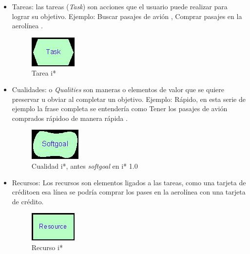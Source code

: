 \begin{itemize}
        \item Tareas: las tareas (\textit{Task}) son acciones que el usuario puede realizar para lograr su objetivo. Ejemplo: \guillemotleft Buscar pasajes de avión \guillemotright, \guillemotleft Comprar pasajes en la aerolínea \guillemotright.
                \begin{figure}[H]
            \centering
            \includegraphics{media/imagenes/i_star/sintaxis/task.jpg}
            \caption{Tarea \gls{i*}}
        \end{figure}
        \item Cualidades: o \textit{Qualities} son maneras o elementos de valor que se quiere preservar u obviar al completar un objetivo. Ejemplo: \guillemotleft Rápido\guillemotright, en esta serie de ejemplo la frase completa se entendería como \guillemotleft Tener los pasajes de avión comprados rápido\guillemotright o de manera \guillemotleft rápida \guillemotright.
                \begin{figure}[h]
            \centering
            \includegraphics{media/imagenes/i_star/sintaxis/softgoal.jpg}
            \caption{Cualidad \gls{i*}, antes \textit{softgoal} en i* 1.0}
        \end{figure}
        \item Recursos: Los recursos son elementos ligados a las tareas, como una \guillemotleft tarjeta de crédito\guillemotleft  en esa línea se podría \guillemotleft comprar los pases en la aerolínea con una tarjeta de crédito\guillemotleft.
                \begin{figure}[h]
            \centering
            \includegraphics{media/imagenes/i_star/sintaxis/resource.jpg}
            \caption{Recurso \gls{i*}}
        \end{figure}
        

\end{itemize}
